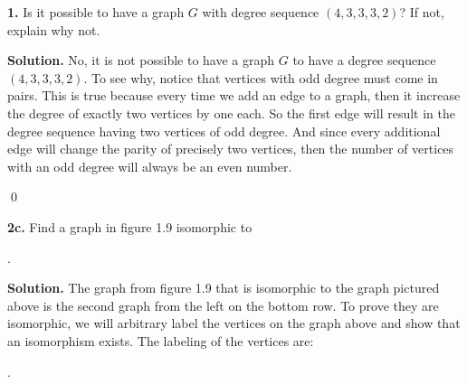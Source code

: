 \documentclass{article}
\begin{document}
\setlength{\parindent}{0cm}   %



\textbf{1.} Is it possible to have a graph \(G\) with degree sequence \((4,3,3,3,2)\)? If not, explain why not.
\vspace{2mm}

\textbf{Solution.} No, it is not possible to have a graph \(G\) to have a degree sequence \((4,3,3,3,2)\). To see why, notice that vertices with odd degree must come in pairs. This is true because every time we add an edge to a graph, then it increase the degree of exactly two vertices by one each. So the first edge will result in the degree sequence having two vertices of odd degree. And since every additional edge will change the parity of precisely two vertices, then the number of vertices with an odd degree will always be an even number.  
\begin{flushright}
\qed
\end{flushright}



\vspace{3mm}
\textbf{2c.} Find a graph in figure 1.9 isomorphic to 

\begin{center}
.
\end{center}

\textbf{Solution.} The graph from figure 1.9 that is isomorphic to the graph pictured above is the second graph from the left on the bottom row. To prove they are isomorphic, we will arbitrary label the vertices on the graph above and show that an isomorphism exists. The labeling of the vertices are: 

\begin{center}
 \hspace{20mm} 
.
\end{center}
\end{document}
